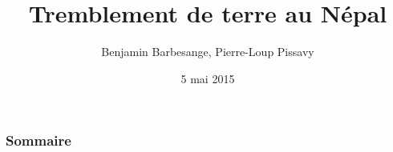 \documentclass[xcolor=dvipsnames]{beamer}
\title[]{Tremblement de terre au Népal}
\author[Benjamin B., Pierre-Loup P.]{Benjamin Barbesange, Pierre-Loup Pissavy}
\institute{ISIMA -- ZZ1 -- Communication}
\date{5 mai 2015}
\begin{document}
	\begin{frame}[plain] %
		\titlepage
	\end{frame}
	\begin{frame} %
		\frametitle{Sommaire}
		\tableofcontents[]
	\end{frame}
  
  
  
  
\end{document}
